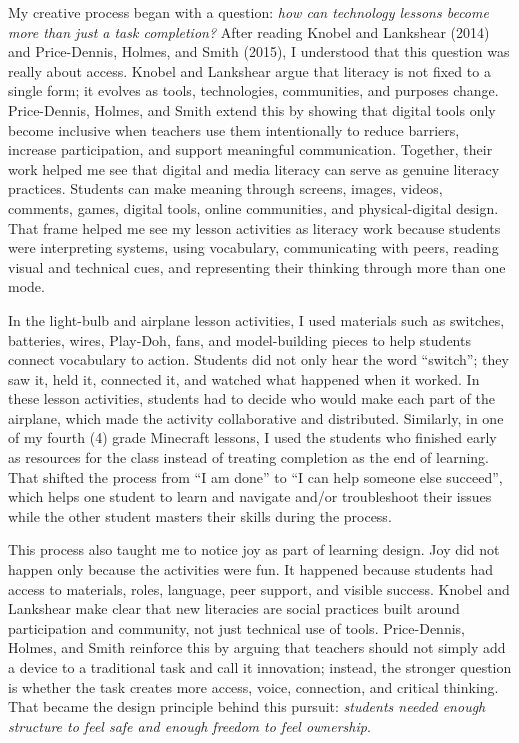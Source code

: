 \documentclass[11pt]{article}
\begin{document}
My creative process began with a question: \textit{how can technology lessons become more than just a task completion?} After reading Knobel and Lankshear (2014) and Price-Dennis, Holmes, and Smith (2015), I understood that this question was really about access. Knobel and Lankshear argue that literacy is not fixed to a single form; it evolves as tools, technologies, communities, and purposes change. Price-Dennis, Holmes, and Smith extend this by showing that digital tools only become inclusive when teachers use them intentionally to reduce barriers, increase participation, and support meaningful communication. Together, their work helped me see that digital and media literacy can serve as genuine literacy practices. Students can make meaning through screens, images, videos, comments, games, digital tools, online communities, and physical-digital design. That frame helped me see my lesson activities as literacy work because students were interpreting systems, using vocabulary, communicating with peers, reading visual and technical cues, and representing their thinking through more than one mode.

In the light-bulb and airplane lesson activities, I used materials such as switches, batteries, wires, Play-Doh, fans, and model-building pieces to help students connect vocabulary to action. Students did not only hear the word ``switch''; they saw it, held it, connected it, and watched what happened when it worked. In these lesson activities, students had to decide who would make each part of the airplane, which made the activity collaborative and distributed. Similarly, in one of my fourth (4) grade Minecraft lessons, I used the students who finished early as resources for the class instead of treating completion as the end of learning. That shifted the process from ``I am done'' to ``I can help someone else succeed'', which helps one student to learn and navigate and/or troubleshoot their issues while the other student masters their skills during the process.

This process also taught me to notice joy as part of learning design. Joy did not happen only because the activities were fun. It happened because students had access to materials, roles, language, peer support, and visible success. Knobel and Lankshear make clear that new literacies are social practices built around participation and community, not just technical use of tools. Price-Dennis, Holmes, and Smith reinforce this by arguing that teachers should not simply add a device to a traditional task and call it innovation; instead, the stronger question is whether the task creates more access, voice, connection, and critical thinking. That became the design principle behind this pursuit: \textit{students needed enough structure to feel safe and enough freedom to feel ownership}.
\end{document}
